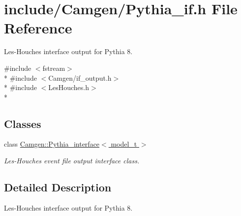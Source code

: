 \hypertarget{a00721}{\section{include/\-Camgen/\-Pythia\-\_\-if.h File Reference}
\label{a00721}
}


Les-\/\-Houches interface output for Pythia 8.  


{\ttfamily \#include $<$fstream$>$}\\*
{\ttfamily \#include $<$Camgen/if\-\_\-output.\-h$>$}\\*
{\ttfamily \#include $<$Les\-Houches.\-h$>$}\\*
\subsection*{Classes}
\begin{DoxyCompactItemize}
\item 
class \hyperlink{a00448}{Camgen\-::\-Pythia\-\_\-interface$<$ model\-\_\-t $>$}
\begin{DoxyCompactList}\small\item\em Les-\/\-Houches event file output interface class. \end{DoxyCompactList}\end{DoxyCompactItemize}


\subsection{Detailed Description}
Les-\/\-Houches interface output for Pythia 8. 